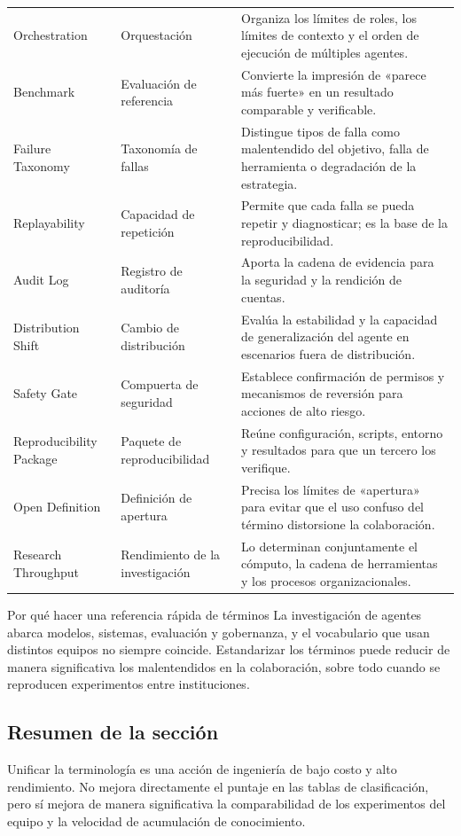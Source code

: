 \begin{longtable}{p{2.7cm}p{3.2cm}p{5.6cm}}
Orchestration & Orquestación & Organiza los límites de roles, los límites de contexto y el orden de ejecución de múltiples agentes. \\
Benchmark & Evaluación de referencia & Convierte la impresión de «parece más fuerte» en un resultado comparable y verificable. \\
Failure Taxonomy & Taxonomía de fallas & Distingue tipos de falla como malentendido del objetivo, falla de herramienta o degradación de la estrategia. \\
Replayability & Capacidad de repetición & Permite que cada falla se pueda repetir y diagnosticar; es la base de la reproducibilidad. \\
Audit Log & Registro de auditoría & Aporta la cadena de evidencia para la seguridad y la rendición de cuentas. \\
Distribution Shift & Cambio de distribución & Evalúa la estabilidad y la capacidad de generalización del agente en escenarios fuera de distribución. \\
Safety Gate & Compuerta de seguridad & Establece confirmación de permisos y mecanismos de reversión para acciones de alto riesgo. \\
Reproducibility Package & Paquete de reproducibilidad & Reúne configuración, scripts, entorno y resultados para que un tercero los verifique. \\
Open Definition & Definición de apertura & Precisa los límites de «apertura» para evitar que el uso confuso del término distorsione la colaboración. \\
Research Throughput & Rendimiento de la investigación & Lo determinan conjuntamente el cómputo, la cadena de herramientas y los procesos organizacionales. \\
\bottomrule
\end{longtable}

\begin{knowledgebox}{Por qué hacer una referencia rápida de términos}
La investigación de agentes abarca modelos, sistemas, evaluación y gobernanza, y el vocabulario que usan distintos equipos no siempre coincide.
Estandarizar los términos puede reducir de manera significativa los malentendidos en la colaboración, sobre todo cuando se reproducen experimentos entre instituciones.
\end{knowledgebox}

\subsection{Resumen de la sección}
Unificar la terminología es una acción de ingeniería de bajo costo y alto rendimiento. No mejora directamente el puntaje en las tablas de clasificación, pero sí mejora de manera significativa la comparabilidad de los experimentos del equipo y la velocidad de acumulación de conocimiento.

